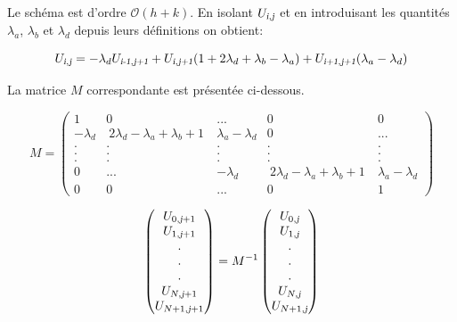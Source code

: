 \documentclass[a4paper, 12pt]{report}
\begin{document}
Le schéma est d'ordre $\mathcal{O}(h+k)$. En isolant $U_{\textsl{i},\textsl{j}}$
et en introduisant les quantités $\lambda_a$, $\lambda_b$ et $\lambda_d$ depuis
leurs définitions on obtient:

\begin{equation}
  U_{\textsl{i},\textsl{j}} = - \lambda_d U_{\textsl{i-1},\textsl{j+1}}
  +U_{\textsl{i},\textsl{j+1}} (1+ 2 \lambda_d + \lambda_b - \lambda_a)
  +U_{\textsl{i+1},\textsl{j+1}} (\lambda_a - \lambda_d)
  \label{eq:schema_implicite}
\end{equation}

La matrice $M$ correspondante est présentée ci-dessous.

\begin{equation}
  M =
  \begin{pmatrix}
     1 & 0 & ... & 0 & 0 \\
     -\lambda_d & \ 2 \lambda_d - \lambda_a + \lambda_b + 1 \ & \lambda_a-\lambda_d &  0 & ...\\
     . & . & . &  . & .\\
     . & . & . &  . & .\\
     . & . & . &  . & .\\
     0 & ... & -\lambda_d & \ 2 \lambda_d - \lambda_a + \lambda_b + 1 \ & \lambda_a-\lambda_d\\
     0 & 0 & ... & 0 & 1
  \end{pmatrix}
\end{equation}

\begin{equation}
\begin{pmatrix}
   U_{0,\textsl{j}+1} \\
   U_{1,\textsl{j}+1} \\
   .\\
   .\\
   .\\
   U_{N,\textsl{j}+1}\\
   U_{N+1,\textsl{j}+1}
\end{pmatrix}
=
M^{-1}
\begin{pmatrix}
   U_{0,\textsl{j}} \\
   U_{1,\textsl{j}} \\
   .\\
   .\\
   .\\
   U_{N,\textsl{j}}\\
   U_{N+1,\textsl{j}}
\end{pmatrix}
\end{equation}
\end{document}
